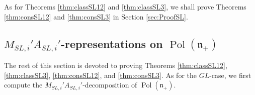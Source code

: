 \documentclass[a4paper,11pt,reqno]{amsart}
\newcommand{\frakn}{\mathfrak{n}}
\newcommand{\0}{{\bf 0}}
\newcommand{\1}{{\bf 1}}
\DeclareMathOperator{\Pol}{Pol}
\theoremstyle{plain}
\theoremstyle{definition}
\numberwithin{equation}{section}
\theoremstyle{definition}
\begin{document}
As for Theorems \ref{thm:classSL12} and \ref{thm:classSL3},
we shall prove Theorems \ref{thm:consSL12}  and \ref{thm:consSL3} 
in Section \ref{sec:ProofSL}. 


\subsection{\texorpdfstring{$M_{SL,i}'A_{SL,i}'$}{M_{SL,i}'A_{SL,i}'}-representations on \texorpdfstring{$\Pol(\frakn_+)$}{Pol(n_+)}}
\label{sec:SL_notation1}

The rest of this section is devoted to proving Theorems \ref{thm:classSL12}, \ref{thm:classSL3},
\ref{thm:consSL12},
and
\ref{thm:consSL3}.
As for the $GL$-case,
we first compute the $M_{SL,i}'A_{SL,i}'$-decomposition of $\Pol(\frakn_+)$.
\end{document}
